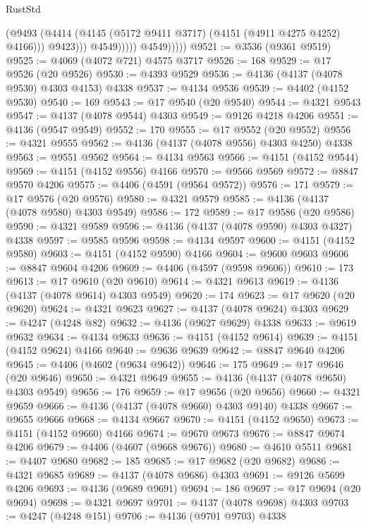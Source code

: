 \begin{lexlean}{RustStd}
\begin{coremodule}
{\begin{coremodule}
{{{{{{{{{{{{{{{{{{{{{{{{{{{{{{{{{{{{{{{{{{{{{{{{{{                            (@9493
                              (@4414 (@4145 (@5172 @9411 @3717) (@4151 (@4911 @4275 @4252) @4166)))
                              @9423)))
                        @4549)))))
              @4549)))))
@9521 := @3536 (@9361 @9519)
@9525 := @4069 (@4072 @721) @4575 @3717
@9526 := 168
@9529 := @17 @9526 (@20 @9526)
@9530 := @4393 @9529
@9536 := @4136 (@4137 (@4078 @9530) @4303 @4153) @4338
@9537 := @4134 @9536
@9539 := @4402 (@4152 @9530)
@9540 := 169
@9543 := @17 @9540 (@20 @9540)
@9544 := @4321 @9543
@9547 := @4137 (@4078 @9544) @4303
@9549 := @9126 @4218 @4206
@9551 := @4136 (@9547 @9549)
@9552 := 170
@9555 := @17 @9552 (@20 @9552)
@9556 := @4321 @9555
@9562 := @4136 (@4137 (@4078 @9556) @4303 @4250) @4338
@9563 := @9551 @9562
@9564 := @4134 @9563
@9566 := @4151 (@4152 @9544)
@9569 := @4151 (@4152 @9556) @4166
@9570 := @9566 @9569
@9572 := @8847 @9570 @4206
@9575 := @4406 (@4591 (@9564 @9572))
@9576 := 171
@9579 := @17 @9576 (@20 @9576)
@9580 := @4321 @9579
@9585 := @4136 (@4137 (@4078 @9580) @4303 @9549)
@9586 := 172
@9589 := @17 @9586 (@20 @9586)
@9590 := @4321 @9589
@9596 := @4136 (@4137 (@4078 @9590) @4303 @4327) @4338
@9597 := @9585 @9596
@9598 := @4134 @9597
@9600 := @4151 (@4152 @9580)
@9603 := @4151 (@4152 @9590) @4166
@9604 := @9600 @9603
@9606 := @8847 @9604 @4206
@9609 := @4406 (@4597 (@9598 @9606))
@9610 := 173
@9613 := @17 @9610 (@20 @9610)
@9614 := @4321 @9613
@9619 := @4136 (@4137 (@4078 @9614) @4303 @9549)
@9620 := 174
@9623 := @17 @9620 (@20 @9620)
@9624 := @4321 @9623
@9627 := @4137 (@4078 @9624) @4303
@9629 := @4247 (@4248 @82)
@9632 := @4136 (@9627 @9629) @4338
@9633 := @9619 @9632
@9634 := @4134 @9633
@9636 := @4151 (@4152 @9614)
@9639 := @4151 (@4152 @9624) @4166
@9640 := @9636 @9639
@9642 := @8847 @9640 @4206
@9645 := @4406 (@4602 (@9634 @9642))
@9646 := 175
@9649 := @17 @9646 (@20 @9646)
@9650 := @4321 @9649
@9655 := @4136 (@4137 (@4078 @9650) @4303 @9549)
@9656 := 176
@9659 := @17 @9656 (@20 @9656)
@9660 := @4321 @9659
@9666 := @4136 (@4137 (@4078 @9660) @4303 @9140) @4338
@9667 := @9655 @9666
@9668 := @4134 @9667
@9670 := @4151 (@4152 @9650)
@9673 := @4151 (@4152 @9660) @4166
@9674 := @9670 @9673
@9676 := @8847 @9674 @4206
@9679 := @4406 (@4607 (@9668 @9676))
@9680 := @4610 @5511
@9681 := @4407 @9680
@9682 := 185
@9685 := @17 @9682 (@20 @9682)
@9686 := @4321 @9685
@9689 := @4137 (@4078 @9686) @4303
@9691 := @9126 @5699 @4206
@9693 := @4136 (@9689 @9691)
@9694 := 186
@9697 := @17 @9694 (@20 @9694)
@9698 := @4321 @9697
@9701 := @4137 (@4078 @9698) @4303
@9703 := @4247 (@4248 @151)
@9706 := @4136 (@9701 @9703) @4338
}}}}}}}}}}}}}}}}}}}}}}}}}}}}}}}}}}}}}}}}}}}}}}}}}}
\end{coremodule}}
\end{coremodule}
\end{lexlean}
